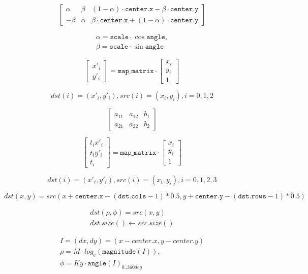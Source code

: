 \documentclass{article}
\begin{document}
\[\begin{bmatrix} \alpha & \beta & (1- \alpha ) \cdot \texttt{center.x} - \beta \cdot \texttt{center.y} \\ - \beta & \alpha & \beta \cdot \texttt{center.x} + (1- \alpha ) \cdot \texttt{center.y} \end{bmatrix}\]
\pagebreak

\[\begin{array}{l} \alpha = \texttt{scale} \cdot \cos \texttt{angle} , \\ \beta = \texttt{scale} \cdot \sin \texttt{angle} \end{array}\]
\pagebreak

\[\begin{bmatrix} x'_i \\ y'_i \end{bmatrix} = \texttt{map_matrix} \cdot \begin{bmatrix} x_i \\ y_i \\ 1 \end{bmatrix}\]
\pagebreak

\[dst(i)=(x'_i,y'_i), src(i)=(x_i, y_i), i=0,1,2\]
\pagebreak

\[\begin{bmatrix} a_{11} & a_{12} & b_1 \\ a_{21} & a_{22} & b_2 \end{bmatrix}\]
\pagebreak

\[\begin{bmatrix} t_i x'_i \\ t_i y'_i \\ t_i \end{bmatrix} = \texttt{map_matrix} \cdot \begin{bmatrix} x_i \\ y_i \\ 1 \end{bmatrix}\]
\pagebreak

\[dst(i)=(x'_i,y'_i), src(i)=(x_i, y_i), i=0,1,2,3\]
\pagebreak

\[dst(x, y) = src(x + \texttt{center.x} - ( \texttt{dst.cols} -1)*0.5, y + \texttt{center.y} - ( \texttt{dst.rows} -1)*0.5)\]
\pagebreak

\[\begin{array}{l} dst( \rho , \phi ) = src(x,y) \\ dst.size() \leftarrow src.size() \end{array}\]
\pagebreak

\[\begin{array}{l} I = (dx,dy) = (x - center.x,y - center.y) \\ \rho = M \cdot log_e(\texttt{magnitude} (I)) ,\\ \phi = Ky \cdot \texttt{angle} (I)_{0..360 deg} \\ \end{array}\]
\pagebreak
\end{document}
